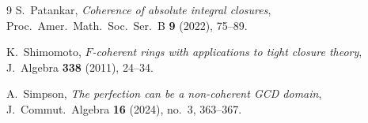 \documentclass[11pt,a4paper]{amsart}
\numberwithin{equation}{section}
\begin{document}
\begin{thebibliography}{9}
S.~Patankar,
\emph{Coherence of absolute integral closures},
Proc.~Amer.~Math.~Soc.~Ser.~B \textbf{9} (2022), 75--89.

K.~Shimomoto,
\emph{$F$-coherent rings with applications to tight closure theory},
J.~Algebra \textbf{338} (2011), 24--34.




A.~Simpson,
\emph{The perfection can be a non-coherent GCD domain},
J.~Commut.~Algebra \textbf{16} (2024), no.~3, 363--367.








 
 

\end{thebibliography}
\end{document}
